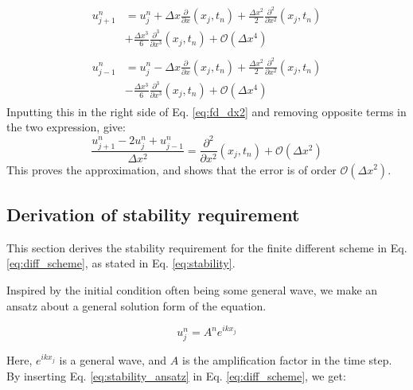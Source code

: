 \begin{align}
\begin{split}
    u_{j+1}^n &= u_j^n + \Delta x \frac{\partial}{\partial x}(x_j, t_n) 
    + \frac{\Delta x^2}{2} \frac{\partial^2}{\partial x^2}(x_j, t_n) 
    \\ &+ \frac{\Delta x^3}{6} \frac{\partial^3}{\partial x^3}(x_j, t_n)
    + \mathcal{O}(\Delta x^4)
\end{split} \\
\begin{split}
    u_{j-1}^n &= u_j^n - \Delta x \frac{\partial}{\partial x}(x_j, t_n)
    + \frac{\Delta x^2}{2} \frac{\partial^2}{\partial x^2}(x_j, t_n) 
    \\ &- \frac{\Delta x^3}{6} \frac{\partial^3}{\partial x^3}(x_j, t_n)
    + \mathcal{O}(\Delta x^4)
\end{split}
\end{align}
Inputting this in the right side of Eq. \eqref{eq:fd_dx2} and removing opposite terms in the two expression, give:
\begin{equation}
    \frac{u_{j+1}^n - 2u_j^n + u_{j-1}^n}{\Delta x^2} =
    \frac{\partial^2}{\partial x^2}(x_j, t_n) + \mathcal{O}(\Delta x^2)
\end{equation}
This proves the approximation, and shows that the error is of order $\mathcal{O}(\Delta x^2)$.
\newpage
\subsection{Derivation of stability requirement} \label{appendixD}

This section derives the stability requirement for the finite different scheme in Eq. \ref{eq:diff_scheme}, as stated in Eq. \ref{eq:stability}.

Inspired by the initial condition often being some general wave, we make an ansatz about a general solution form of the equation.

\begin{equation}
    \label{eq:stability_ansatz}
    u_j^n = A^n e^{i k x_j}
\end{equation}

Here, $e^{i k x_j}$ is a general wave, and $A$ is the amplification factor in the time step.
By inserting Eq. \ref{eq:stability_ansatz} in Eq. \ref{eq:diff_scheme}, we get:

